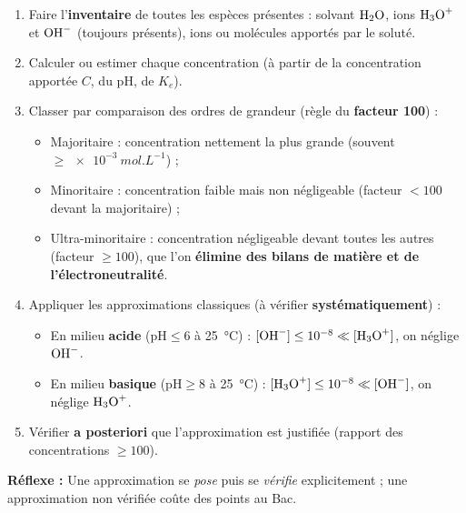 \documentclass[11pt]{article}
\newcommand{\cle}[1]{{\popxbold\color{popdark}#1}}
\begin{document}
\begin{methode}
\begin{enumerate}
\item Faire l'\textbf{inventaire} de toutes les espèces présentes : solvant $\ce{H2O}$, ions $\ce{H3O+}$ et $\ce{OH-}$ (toujours présents), ions ou molécules apportés par le soluté.
\item Calculer ou estimer chaque concentration (à partir de la concentration apportée $C$, du pH, de $K_e$).
\item Classer par comparaison des ordres de grandeur (règle du \textbf{facteur 100}) :
\begin{itemize}
\item \cle{Majoritaire} : concentration nettement la plus grande (souvent $\geq \SI{e-3}{mol.L^{-1}}$) ;
\item \cle{Minoritaire} : concentration faible mais non négligeable (facteur $< 100$ devant la majoritaire) ;
\item \cle{Ultra-minoritaire} : concentration négligeable devant toutes les autres (facteur $\geq 100$), que l'on \textbf{élimine des bilans de matière et de l'électroneutralité}.
\end{itemize}
\item Appliquer les approximations classiques (à vérifier \textbf{systématiquement}) :
\begin{itemize}
\item En milieu \textbf{acide} ($\mathrm{pH} \leq 6$ à \SI{25}{\celsius}) : $[\ce{OH-}] \leq 10^{-8} \ll [\ce{H3O+}]$, on néglige $\ce{OH-}$.
\item En milieu \textbf{basique} ($\mathrm{pH} \geq 8$ à \SI{25}{\celsius}) : $[\ce{H3O+}] \leq 10^{-8} \ll [\ce{OH-}]$, on néglige $\ce{H3O+}$.
\end{itemize}
\item Vérifier \textbf{a posteriori} que l'approximation est justifiée (rapport des concentrations $\geq 100$).
\end{enumerate}
\textbf{Réflexe :} Une approximation se \emph{pose} puis se \emph{vérifie} explicitement ; une approximation non vérifiée coûte des points au Bac.
\end{methode}
\end{document}
